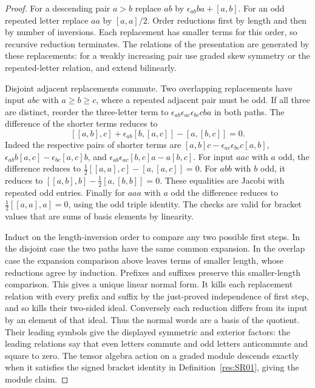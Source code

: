 \begin{proof}
For a descending pair \(a>b\) replace \(ab\) by
\(\epsilon_{ab}ba+[a,b]\). For an odd repeated letter
replace \(aa\) by \([a,a]/2\). Order reductions first
by length and then by number of inversions. Each
replacement has smaller terms for this order, so
recursive reduction terminates. The relations of the
presentation are generated by these replacements:
for a weakly increasing pair use graded skew symmetry
or the repeated-letter relation, and extend bilinearly.

Disjoint adjacent replacements commute. Two overlapping
replacements have input \(abc\) with \(a\ge b\ge c\),
where a repeated adjacent pair must be odd. If all
three are distinct, reorder the three-letter term to
\(\epsilon_{ab}\epsilon_{ac}\epsilon_{bc}cba\) in
both paths. The difference of the shorter terms reduces
to
\[
 [[a,b],c]+\epsilon_{ab}[b,[a,c]]-[a,[b,c]]=0.
\]
Indeed the respective pairs of shorter terms are
\([a,b]c-\epsilon_{ac}\epsilon_{bc}c[a,b]\),
\(\epsilon_{ab}b[a,c]-\epsilon_{bc}[a,c]b\), and
\(\epsilon_{ab}\epsilon_{ac}[b,c]a-a[b,c]\).
For input \(aac\) with \(a\) odd, the difference reduces to
\(\tfrac12[[a,a],c]-[a,[a,c]]=0\).
For \(abb\) with \(b\) odd, it reduces to
\([[a,b],b]-\tfrac12[a,[b,b]]=0\).
These equalities are Jacobi with repeated odd entries.
Finally for \(aaa\) with \(a\) odd the difference reduces to
\(\tfrac12[[a,a],a]=0\), using the odd triple identity.
The checks are valid for bracket values that are sums of
basis elements by linearity.

Induct on the length-inversion order to compare any two possible
first steps. In the disjoint case the two paths have the same
common expansion. In the overlap case the expansion comparison
above leaves terms of smaller length, whose reductions agree by
induction. Prefixes and suffixes preserve this smaller-length
comparison. This gives a unique linear normal form. It kills
each replacement relation with every prefix and suffix by
the just-proved independence of first step, and so kills
their two-sided ideal. Conversely each reduction differs
from its input by an element of that ideal. Thus the normal
words are a basis of the quotient. Their leading symbols
give the displayed symmetric and exterior factors:
the leading relations say that even letters commute and
odd letters anticommute and square to zero. The tensor
algebra action on a graded module descends exactly when it
satisfies the signed bracket identity in
Definition~\ref{res:SR01}, giving the module claim.
\end{proof}

